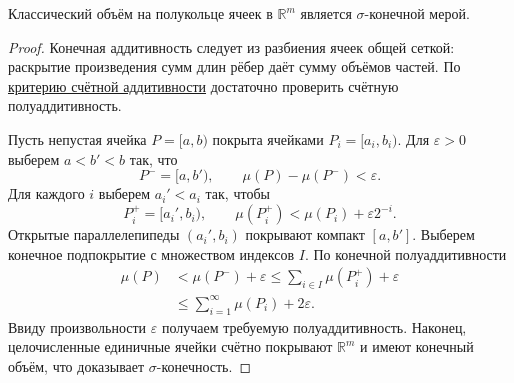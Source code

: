 \label{ticket:21}

\begin{theorem}
Классический объём на полукольце ячеек в $\mathbb R^m$ является $\sigma$-конечной мерой.
\end{theorem}

\begin{proof}
Конечная аддитивность следует из разбиения ячеек общей сеткой: раскрытие произведения сумм длин рёбер даёт сумму объёмов частей.
По \hyperref[ticket:19]{критерию счётной аддитивности} достаточно проверить счётную полуаддитивность.

Пусть непустая ячейка $P=[a,b)$ покрыта ячейками $P_i=[a_i,b_i)$.
Для $\varepsilon>0$ выберем $a<b'<b$ так, что
\[
  P^-=[a,b'),\qquad \mu(P)-\mu(P^-)<\varepsilon.
\]
Для каждого $i$ выберем $a_i'<a_i$ так, чтобы
\[
  P_i^+=[a_i',b_i),\qquad
  \mu(P_i^+)<\mu(P_i)+\varepsilon2^{-i}.
\]
Открытые параллелепипеды $(a_i',b_i)$ покрывают компакт $[a,b']$.
Выберем конечное подпокрытие с множеством индексов $I$.
По конечной полуаддитивности
\[
  \begin{aligned}
  \mu(P)&<\mu(P^-)+\varepsilon
  \le\sum_{i\in I}\mu(P_i^+)+\varepsilon\\
  &\le\sum_{i=1}^{\infty}\mu(P_i)+2\varepsilon.
  \end{aligned}
\]
Ввиду произвольности $\varepsilon$ получаем требуемую полуаддитивность.
Наконец, целочисленные единичные ячейки счётно покрывают $\mathbb R^m$ и имеют конечный объём, что доказывает $\sigma$-конечность.
\end{proof}
